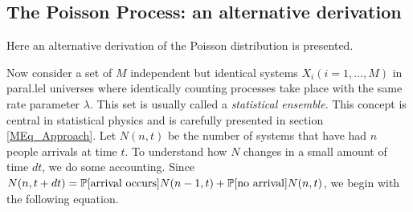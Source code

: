  \subsection{The Poisson Process: an alternative derivation}
\label{subsection:Poisson_Process}
Here an alternative derivation of the Poisson distribution is presented. 
\smallskip

Now consider a set of $M$ independent but identical systems $X_i (i = 1, ..., M)$ in paral.lel universes where identically counting processes take place with the same rate parameter $\lambda$. This set is usually called a {\em statistical ensemble}. This concept is central in statistical physics and is carefully presented in section \ref{MEq_Approach}.  Let $N(n, t)$ be the number of systems that have had $n$ people arrivals at time $t$. To understand how $N$ changes in a small amount of time $dt$, we do some accounting. Since $N(n, t + dt) = {\mathbb P}[\textrm{arrival occurs}] N(n-1, t) + {\mathbb P}[\textrm{no arrival}] N(n,t)$, we begin with the following equation.

